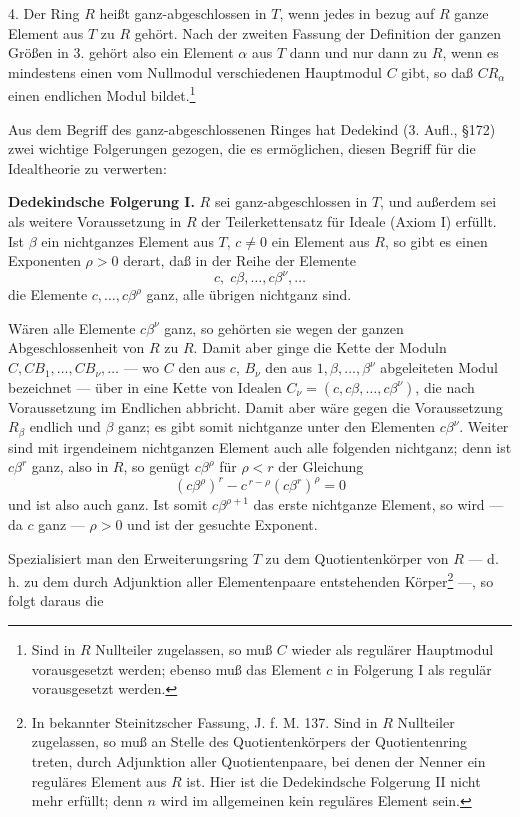 \documentclass[11pt]{article}
\begin{document}
4. Der Ring $R$ heißt ganz-abgeschlossen in $T$, wenn jedes in bezug auf $R$ ganze
Element aus $T$ zu $R$ gehört. Nach der zweiten Fassung der Definition der ganzen
Größen in 3. gehört also ein Element $\alpha$ aus $T$ dann und nur dann zu $R$,
wenn es mindestens einen vom Nullmodul verschiedenen Hauptmodul $C$ gibt, so
daß $CR_\alpha$ einen endlichen Modul bildet.\footnote{Sind in $R$ Nullteiler
zugelassen, so muß $C$ wieder als regulärer Hauptmodul vorausgesetzt werden;
ebenso muß das Element $c$ in Folgerung I als regulär vorausgesetzt werden.}

Aus dem Begriff des ganz-abgeschlossenen Ringes hat Dedekind (3. Aufl., §172)
zwei wichtige Folgerungen gezogen, die es ermöglichen, diesen Begriff für die
Idealtheorie zu verwerten:

\medskip
\noindent\textbf{Dedekindsche Folgerung I.} $R$ sei ganz-abgeschlossen in $T$,
und außerdem sei als weitere Voraussetzung in $R$ der Teilerkettensatz für Ideale
(Axiom I) erfüllt. Ist $\beta$ ein nichtganzes Element aus $T$, $c\ne0$ ein Element
aus $R$, so gibt es einen Exponenten $\rho>0$ derart, daß in der Reihe der Elemente
\[
        c,\;c\beta,\ldots,c\beta^\nu,\ldots
\]
die Elemente $c,\ldots,c\beta^\rho$ ganz, alle übrigen nichtganz sind.

Wären alle Elemente $c\beta^\nu$ ganz, so gehörten sie wegen der ganzen
Abgeschlossenheit von $R$ zu $R$. Damit aber ginge die Kette der Moduln
$C,CB_1,\ldots,CB_\nu,\ldots$ — wo $C$ den aus $c$, $B_\nu$ den aus
$1,\beta,\ldots,\beta^\nu$ abgeleiteten Modul bezeichnet — über in eine Kette von
Idealen $C_\nu=(c,c\beta,\ldots,c\beta^\nu)$, die nach Voraussetzung im Endlichen
abbricht. Damit aber wäre gegen die Voraussetzung $R_\beta$ endlich und $\beta$
ganz; es gibt somit nichtganze unter den Elementen $c\beta^\nu$. Weiter sind mit
irgendeinem nichtganzen Element auch alle folgenden nichtganz; denn ist
$c\beta^r$ ganz, also in $R$, so genügt $c\beta^\rho$ für $\rho<r$ der Gleichung
\[
        (c\beta^\rho)^r-c^{\,r-\rho}(c\beta^r)^\rho=0
\]
und ist also auch ganz. Ist somit $c\beta^{\rho+1}$ das erste nichtganze Element,
so wird — da $c$ ganz — $\rho>0$ und ist der gesuchte Exponent.

Spezialisiert man den Erweiterungsring $T$ zu dem Quotientenkörper von $R$ —
d.\,h. zu dem durch Adjunktion aller Elementenpaare entstehenden Körper\footnote{
In bekannter Steinitzscher Fassung, J. f. M. 137. Sind in $R$ Nullteiler zugelassen,
so muß an Stelle des Quotientenkörpers der Quotientenring treten, durch Adjunktion
aller Quotientenpaare, bei denen der Nenner ein reguläres Element aus $R$ ist.
Hier ist die Dedekindsche Folgerung II nicht mehr erfüllt; denn $n$ wird im
allgemeinen kein reguläres Element sein.} —, so folgt daraus die
\end{document}
